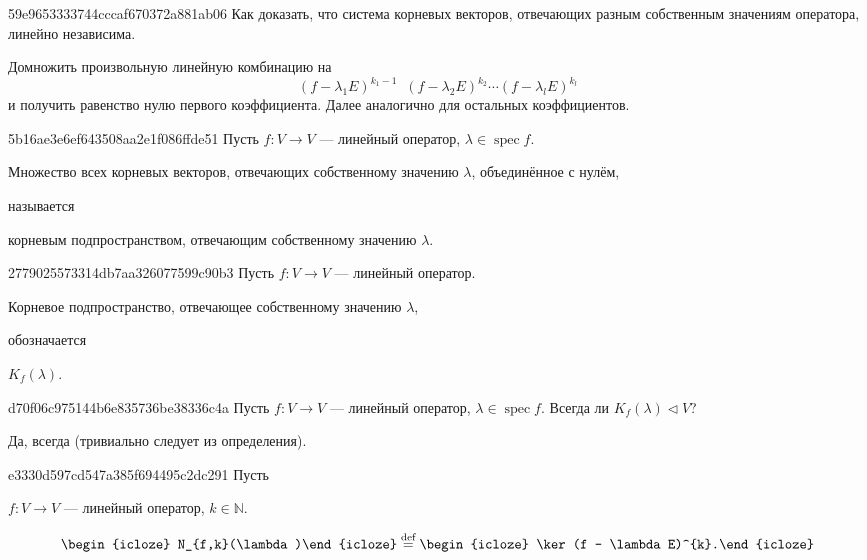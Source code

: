\begin{note}{59e9653333744cccaf670372a881ab06}
    Как доказать, что система корневых векторов, отвечающих разным собственным значениям оператора, линейно независима.

    \begin{cloze}{1}
        Домножить произвольную линейную комбинацию на
        \[
            (f - \lambda_1 E)^{k_1 - 1} \;\; (f - \lambda_2 E)^{k_2} \cdots (f - \lambda_l E)^{k_l}
        \]
        и получить равенство нулю первого коэффициента. Далее аналогично для остальных коэффициентов.
    \end{cloze}
\end{note}

\begin{note}{5b16ae3e6ef643508aa2e1f086ffde51}
    Пусть \( f : V \to V \) --- линейный оператор, \( \lambda \in \operatorname{spec} f \).
    \begin{icloze}{1}Множество всех корневых векторов, отвечающих собственному значению \( \lambda \), объединённое с нулём,\end{icloze} называется \begin{icloze}{2}корневым подпространством, отвечающим собственному значению \( \lambda \).\end{icloze}
\end{note}

\begin{note}{2779025573314db7aa326077599c90b3}
    Пусть \( f : V \to V \) --- линейный оператор.
    \begin{icloze}{2}Корневое подпространство, отвечающее собственному значению \( \lambda \),\end{icloze} обозначается \begin{icloze}{1}\( K_f (\lambda) \).\end{icloze}
\end{note}

\begin{note}{d70f06c975144b6e835736be38336c4a}
    Пусть \( f : V \to V \) --- линейный оператор, \( \lambda \in \operatorname{spec} f \).
    Всегда ли \( K_f(\lambda) \triangleleft V \)?

    \begin{cloze}{1}
        Да, всегда (тривиально следует из определения).
    \end{cloze}
\end{note}

\begin{note}{e3330d597cd547a385f694495c2dc291}
    Пусть \begin{icloze}{3}\( f : V \to V \) --- линейный оператор, \( k \in \mathbb N \).\end{icloze}
    \[
        \begin{icloze}{2}N_{f,k}(\lambda)\end{icloze} \overset{\text{def}}= \begin{icloze}{1}\ker (f - \lambda E)^{k}.\end{icloze}
    \]
\end{note}

